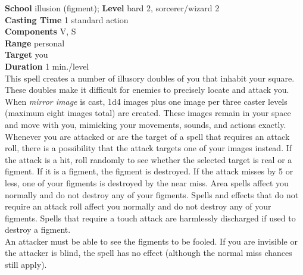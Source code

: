 \textbf{School }illusion (figment); \textbf{Level }bard 2, sorcerer/wizard 2\\
\textbf{Casting Time }1 standard action\\
\textbf{Components }V, S\\
\textbf{Range }personal\\
\textbf{Target }you\\
\textbf{Duration }1 min./level\\
This spell creates a number of illusory doubles of you that inhabit your square. These doubles make it difficult for enemies to precisely locate and attack you. \\
When \textit{mirror image }is cast, 1d4 images plus one image per three caster levels (maximum eight images total) are created. These images remain in your space and move with you, mimicking your movements, sounds, and actions exactly. Whenever you are attacked or are the target of a spell that requires an attack roll, there is a possibility that the attack targets one of your images instead. If the attack is a hit, roll randomly to see whether the selected target is real or a figment. If it is a figment, the figment is destroyed. If the attack misses by 5 or less, one of your figments is destroyed by the near miss. Area spells affect you normally and do not destroy any of your figments. Spells and effects that do not require an attack roll affect you normally and do not destroy any of your figments. Spells that require a touch attack are harmlessly discharged if used to destroy a figment.\\
An attacker must be able to see the figments to be fooled. If you are invisible or the attacker is blind, the spell has no effect (although the normal miss chances still apply).\\
